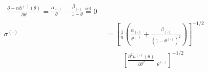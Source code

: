 \documentclass[12pt, letterpaper]{article}
\begin{document}
\begin{align*}
\begin{array}{l}
		\frac{ \partial - n h^{(\cdot)}(\theta) }{\partial \theta} =  \frac{\alpha_{(\cdot)}}{\theta} - \frac{\beta_{(\cdot)}}{1 - \theta} \stackrel{\text{set}}{=} 0 
		\end{array} 
	\\[1ex]
	\sigma^{(\cdot)} & 
	= \left[ \frac{1}{n} \left(  \frac{ \alpha_{(\cdot)}}{ \theta^{(\cdot)} } + \frac{\beta_{(\cdot)}}{(1 - \theta^{(\cdot)})^2}\right) \right]^{-1/2} 
	\\[1ex]
	& \quad \quad \begin{array}{l} 
	\left[ \frac{ \partial^2 h^{(\cdot)}(\theta)}{\partial \theta^2} \Big|_{\theta^{(\cdot)}} \right]^{-1/2}
	\end{array} 
\end{align*}

 
\end{document}
